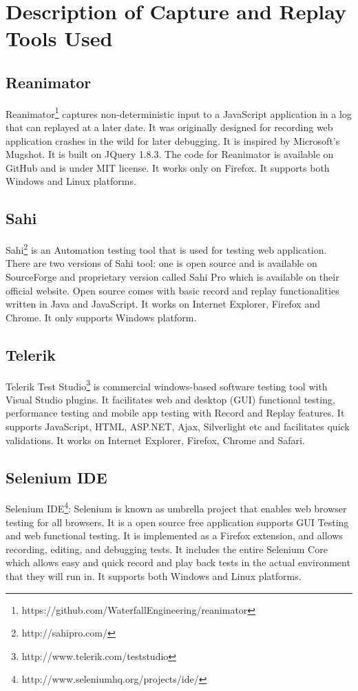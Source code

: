 \documentclass[12pt,journal]{IEEEtran}
\begin{document}
\section{Description of Capture and Replay Tools Used}
\subsection{Reanimator}
Reanimator\footnote{https://github.com/WaterfallEngineering/reanimator} captures non-deterministic input to a JavaScript application in a log that can replayed at a later date. It was originally designed for recording web application crashes in the wild for later debugging. It is inspired by Microsoft’s Mugshot. It is built on JQuery 1.8.3. The code for Reanimator is available on GitHub and is under MIT license. It works only on Firefox. It supports both Windows and Linux platforms.

\subsection{Sahi}
Sahi\footnote{http://sahipro.com/} is an Automation testing tool that is used for testing web application. There are two versions of Sahi tool: one is open source and is available on SourceForge and proprietary version called Sahi Pro which is available on their official website. Open source comes with basic record and replay functionalities written in Java and JavaScript. It works on Internet Explorer, Firefox and Chrome. It only supports Windows platform.

\subsection{Telerik}
Telerik Test Studio\footnote{http://www.telerik.com/teststudio} is commercial windows-based software testing tool with Visual Studio plugins. It facilitates web and desktop (GUI) functional testing, performance testing and mobile app testing with Record and Replay features. It supports JavaScript, HTML, ASP.NET, Ajax, Silverlight etc and facilitates quick validations. It works on Internet Explorer, Firefox, Chrome and Safari.

\subsection{Selenium IDE}
Selenium IDE\footnote{http://www.seleniumhq.org/projects/ide/}: Selenium is known as umbrella project that enables web browser testing for all browsers. It is a open source free application supports GUI Testing and web functional testing. It is implemented as a Firefox extension, and allows recording, editing, and debugging tests. It includes the entire Selenium Core which allows easy and quick record and play back tests in the actual environment that they will run in. It supports both Windows and Linux platforms.
\end{document}
